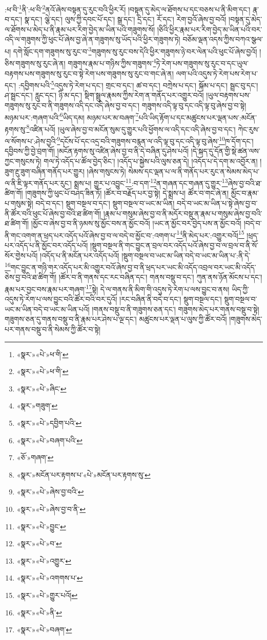 :ཕ་བི་\footnote{«སྣར་»«པེ་»ཕ་གི་}ནི་:ཕ་བི་\footnote{«སྣར་»«པེ་»ཕ་གི་}ནའོ་ཞེས་བསྟན་དུ་རུང་བའི་ཕྱིར་རོ། །བསྟན་དུ་མེད་ལ་ཐོགས་པ་དང་བཅས་པ་ནི་མིག་དང་། རྣ་བ་དང་། སྣ་དང་། ལྕེ་དང་། ལུས་ཀྱི་དབང་པོ་དང་། སྒྲ་དང་། དྲི་དང་། རོ་དང་། རེག་བྱའོ་ཞེས་བྱ་བའོ། །བསྟན་དུ་མེད་ལ་ཐོགས་པ་མེད་པ་ནི་རྣམ་པར་རིག་བྱེད་མ་ཡིན་པའི་གཟུགས་སོ། །ཅིའི་ཕྱིར་རྣམ་པར་རིག་བྱེད་མ་ཡིན་པའི་བར་འདི་ལ་གཟུགས་ཀྱི་ཕུང་པོ་ཞེས་བྱ་ཞེ་ན་གཟུགས་སུ་ཡོད་པའི་ཕྱིར་གཟུགས་ཏེ། བཅོམ་ལྡན་འདས་ཀྱིས་བཀའ་སྩལ་པ། དགེ་སློང་དག་གཟུགས་སུ་རུང་བ་\footnote{«སྣར་»«པེ་»ཞིང་}གཟུགས་སུ་རུང་བས་དེའི་ཕྱིར་གཟུགས་ཉེ་བར་ལེན་པའི་ཕུང་པོ་ཞེས་བྱའོ། །ཅིས་གཟུགས་སུ་རུང་ཞེ་ན། གཟུགས་རྣམ་པ་གཉིས་ཀྱིས་གཟུགས་\footnote{«སྣར་»གཟུག་}ཏེ་རེག་པས་གཟུགས་སུ་རུང་བ་དང་ཡུལ་བརྟགས་པས་གཟུགས་སུ་རུང་བ་སྟེ་རེག་པས་གཟུགས་སུ་རུང་བ་གང་ཞེ་ན། ལག་པའི་འདུས་ཏེ་རེག་པས་རེག་པ་དང་། :དབྱིགས་པའི་\footnote{«སྣར་»«པེ་»དབྱིག་པའི་}འདུས་ཏེ་རེག་པ་དང་། གྲང་བ་དང་། ཚ་བ་དང་། བཀྲེས་པ་དང་། སྐོམ་པ་དང་། སྦྲང་བུ་དང་། ཤ་སྦྲང་དང་། རླུང་དང་། ཉི་མ་དང་། སྡིག་སྦྲུལ་རྣམས་ཀྱིས་རེག་ན་གནོད་པར་འགྱུར་བའོ། །ཡུལ་བརྟགས་པས་གཟུགས་སུ་རུང་བ་ནི་གཟུགས་འདི་དང་འདི་ཞེས་བྱ་བ་དང་། གཟུགས་འདི་ལྟ་བུ་དང་འདི་ལྟ་བུ་ཞེས་བྱ་བ་སྟེ། མཉམ་པར་:གཞག་པའི་\footnote{«སྣར་»«པེ་»བཞག་པའི་}ཡིད་དམ། མཉམ་པར་མ་བཞག་\footnote{«ཅོ་»གཞག་}པའི་ཡིད་རྟོག་པ་དང་མཚུངས་པར་ལྡན་པས་:མངོན་རྟགས་སུ་\footnote{«སྣར་»མངོན་པར་རྟགས་པ་«པེ་»མངོན་པར་རྟགས་སུ་}འཛིན་པའོ། །ཡུལ་ཞེས་བྱ་བ་མངོན་སུམ་དུ་གྱུར་པའི་ཕྱོགས་ལ་འདི་དང་འདི་ཞེས་བྱ་བ་དང་། ཀེང་རུས་ལ་སོགས་པ་:ཤེས་བྱའི་\footnote{«སྣར་»«པེ་»ཞེས་བྱ་བའི་}དངོས་པོ་དང་འདྲ་བའི་གཟུགས་བརྙན་ལ་འདི་ལྟ་བུ་དང་འདི་ལྟ་བུ་ཞེས་\footnote{«སྣར་»«པེ་»ཞེས་བྱ་བ་ནི་}ཁ་དོག་དང་། དབྱིབས་ཀྱི་བྱེ་བྲག་གོ། །མངོན་རྟགས་སུ་འཛིན་ཞེས་བྱ་བ་ནི་དེ་བཞིན་དུ་ཤེས་པའོ། །དེ་སྐད་དུ་དོན་གྱི་སྡེ་ཚན་ལས་ཀྱང་གསུངས་ཏེ། གལ་ཏེ་འདོད་པ་ཚོལ་བྱེད་ཅིང་། །འདོད་པ་སྐྱེས་པའི་ལུས་ཅན་དེ། །འདོད་པ་དེ་དག་མ་འབྱོར་ན། །ཟུག་རྔུ་ཟུག་བཞིན་གནོད་པར་གྱུར། །ཞེས་གསུངས་ཏེ། སེམས་དང་ལྡན་པ་ལ་ནི་གནོད་པར་རུང་ན་སེམས་མེད་པ་ལ་ནི་ཇི་ལྟར་གནོད་པར་རུང་། སྨྲས་པ། གྱུར་པ་འབྱུང་\footnote{«སྣར་»«པེ་»བྱུང་}:བ་དག་\footnote{«སྣར་»«པེ་»བ་}ན་གཞན་དང་གཞན་དུ་གྱུར་\footnote{«སྣར་»«པེ་»འགྱུར་}ཞེས་བྱ་བའི་ཐ་ཚིག་གོ། །གཟུགས་ཀྱི་ཕུང་པོ་བཤད་ཟིན་ཏོ། །ཚོར་བ་བརྗོད་པར་བྱ་སྟེ། དེ་སྨྲས་པ། ཚོར་བ་གང་ཞེ་ན། མྱོང་བ་རྣམ་པ་གསུམ་སྟེ། བདེ་བ་དང་། སྡུག་བསྔལ་བ་དང་། སྡུག་བསྔལ་བ་ཡང་མ་ཡིན། བདེ་བ་ཡང་མ་ཡིན་པ་སྟེ་ཞེས་བྱ་བ་ནི་ཚོར་བའི་ཕུང་པོ་ཞེས་བྱ་བའི་ཐ་ཚིག་གོ། །རྣམ་པ་གསུམ་ཞེས་བྱ་བ་ནི་མདོར་བསྡུ་ན་རྣམ་པ་གསུམ་ཞེས་བྱ་བའི་ཐ་ཚིག་གོ། །མྱོང་བ་ཞེས་བྱ་བ་ནི་ཉམས་སུ་མྱོང་བས་ན་མྱོང་བའོ། །ཡང་ན་མྱོང་བར་བྱེད་པས་ན་མྱོང་བའོ། །བདེ་བ་ནི་གང་འགག་ན་ཕྲད་པར་འདོད་པའོ་ཞེས་བྱ་བ་ལ་བདེ་བ་མྱོང་བ་:འགག་པ་\footnote{«སྣར་»«པེ་»འགགས་པ་}ནི་མེད་པར་:འགྱུར་བའོ།\footnote{«སྣར་»«པེ་»གྱུར་པའོ།} །ཕྲད་པར་འདོད་པ་ནི་མྱོང་བར་འདོད་པའོ། །སྡུག་བསྔལ་ནི་གང་བྱུང་ན་བྲལ་བར་འདོད་པའོ་ཞེས་བྱ་བ་ལ་བྲལ་བ་ནི་སོ་སོར་གྱེས་པའོ། །འདོད་པ་ནི་མངོན་པར་འདོད་པའོ། །སྡུག་བསྔལ་བ་ཡང་མ་ཡིན་བདེ་བ་ཡང་མ་ཡིན་པ་:ནི་དེ་\footnote{«སྣར་»«པེ་»ནི་}གང་བྱུང་ན་གཉི་གར་འདོད་པར་མི་འགྱུར་བའོ་ཞེས་བྱ་བ་ནི་ཕྲད་པར་ཡང་མི་འདོད་འབྲལ་བར་ཡང་མི་འདོད་ཅེས་བྱ་བའི་ཐ་ཚིག་གོ། །ཚོར་བ་ནི་གནས་དང་རང་བཞིན་དང་། གནས་བསྡུ་བ་དང་། ཀུན་ནས་ཉོན་མོངས་པ་དང་། རྣམ་པར་བྱང་བས་རྣམ་པར་གཞག་\footnote{«སྣར་»«པེ་»བཞག་}སྟེ། དེ་ལ་གནས་ནི་མིག་གི་འདུས་ཏེ་རེག་པ་ལས་བྱུང་བ་ནས། ཡིད་ཀྱི་འདུས་ཏེ་རེག་པ་ལས་བྱུང་བའི་ཚོར་བའི་བར་དུའོ། །རང་བཞིན་ནི་བདེ་བ་དང་། སྡུག་བསྔལ་དང་། སྡུག་བསྔལ་བ་ཡང་མ་ཡིན་བདེ་བ་ཡང་མ་ཡིན་པའོ། །གནས་བསྡུ་བ་ནི་གཟུགས་ཅན་དང་། གཟུགས་མེད་པར་གནས་བསྡུ་བ་སྟེ། གཟུགས་ཅན་དུ་གནས་བསྡུ་བ་ནི་རྣམ་པར་ཤེས་པ་ལྔ་དང་། མཚུངས་པར་ལྡན་པ་ལུས་ཀྱི་ཚོར་བའོ། །གཟུགས་མེད་པར་གནས་བསྡུ་བ་ནི་སེམས་ཀྱི་ཚོར་བ་སྟེ། 
